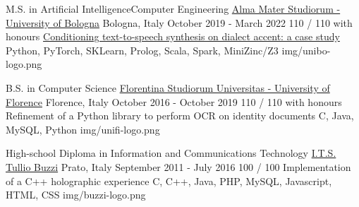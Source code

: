 
\begin{cventries}

  \logocventry
    {M.S. in Artificial Intelligence{\enskip\cdotp\enskip}Computer Engineering}
    {\href{https://www.unibo.it/en/homepage}{Alma Mater Studiorum - University of Bologna}}
    {Bologna, Italy}
    {October 2019 - March 2022}
    {
      \cvedu
        {110 / 110 with honours}
        {\href{https://amslaurea.unibo.it/id/eprint/25805/}{Conditioning text-to-speech synthesis on dialect accent: a case study}}
        {Python, PyTorch, SKLearn, Prolog, Scala, Spark, MiniZinc/Z3}
    }
    {img/unibo-logo.png}

  \logocventry
    {B.S. in Computer Science}
    {\href{https://www.unifi.it/}{Florentina Studiorum Universitas - University of Florence}}
    {Florence, Italy}
    {October 2016 - October 2019}
    {
      \cvedu
        {110 / 110 with honours}
        {Refinement of a Python library to perform OCR on identity documents}
        {C, Java, MySQL, Python}
    }
    {img/unifi-logo.png}

  \logocventry
    {High-school Diploma in Information and Communications Technology}
    {\href{https://www.tulliobuzzi.edu.it/}{I.T.S. Tullio Buzzi}}
    {Prato, Italy}
    {September 2011 - July 2016}
    {
      \cvedu
        {100 / 100}
        {Implementation of a C++ holographic experience}
        {C, C++, Java, PHP, MySQL, Javascript, HTML, CSS}
    }
    {img/buzzi-logo.png}

\end{cventries}
